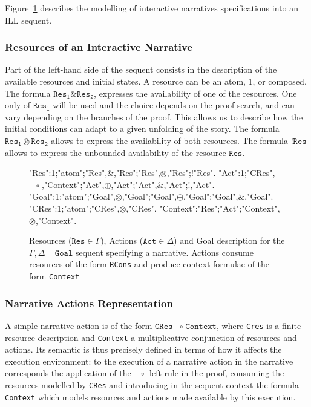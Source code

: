 \documentclass[runningheads,a4paper]{llncs}
\begin{document}
Figure~\ref{fig:sequent_grammars} describes the modelling of interactive narratives specifications into an ILL sequent.
%
\subsubsection{Resources of an Interactive Narrative}
Part of the left-hand side of the sequent consists in the description of the available resources and initial states. A resource can be an atom, 1, or composed. The formula $\mathtt{Res_{1}}\&\mathtt{Res_{2}}$, expresses the availability of one of the resources. One only of $\mathtt{Res_{i}}$ will be used and the choice depends on the proof search, and can vary depending on the branches of the proof. This allows us to describe how the initial conditions can adapt to a given unfolding of the story. The formula $\mathtt{Res_{1}} \otimes \mathtt{Res_{2}}$ allows to express the availability of both resources. The formula $!\mathtt{Res}$ allows to express the unbounded availability of the resource $\mathtt{Res}$.
\begin{figure}
\begin{grammar}
"Res":1;"atom";"Res",$\&$,"Res";"Res",$\otimes$,"Res";!"Res".
"Act":1;"CRes",$\multimap$,"Context";"Act",$\oplus$,"Act";"Act",$\&$,"Act";!,"Act".
"Goal":1;"atom";"Goal",$\otimes$,"Goal";"Goal",$\oplus$,"Goal";"Goal",$\&$,"Goal".\\
"CRes":1;"atom";"CRes",$\otimes$,"CRes".
"Context":"Res";"Act";"Context",$\otimes$,"Context".
\end{grammar}
\caption{Resources ($\mathtt{Res}\in\Gamma$), Actions ($\mathtt{Act}\in\Delta$) and Goal description for the $\Gamma, \Delta \vdash \mathtt{Goal}$ sequent specifying a narrative. Actions consume resources of the form \texttt{RCons} and produce context formulae of the form \texttt{Context}\label{fig:sequent_grammars}}
\end{figure}
%
\subsubsection{Narrative Actions Representation}
A simple narrative action is of the form $\mathtt{CRes} \multimap \mathtt{Context}$, where \texttt{Cres} is a finite resource description and \texttt{Context} a multiplicative conjunction of resources and actions. Its semantic is thus precisely defined in terms of how it affects the execution environment: to the execution of a narrative action in the narrative corresponds the application of the $\multimap$ left rule in the proof, consuming the resources modelled by \texttt{CRes} and introducing in the sequent context the formula \texttt{Context} which models resources and actions made available by this execution.
\end{document}
